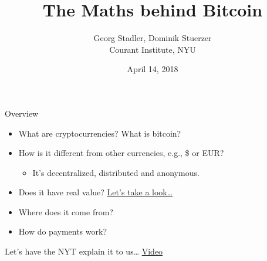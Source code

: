 \documentclass[12pt]{beamer}
\title{{\bf The Maths behind Bitcoin }}
\date{April 14, 2018}
\author{Georg Stadler, Dominik Stuerzer \\ Courant Institute, NYU}
\theoremstyle{definition}
\numberwithin{equation}{section}
\begin{document}
\begin{frame}
\maketitle
\end{frame}


\begin{frame}{Overview}
  \begin{itemize}
  \item What are cryptocurrencies? What is bitcoin?\\[3ex]
    \pause
  \item How is it different from other currencies, e.g., \$ or EUR? \\[1ex]
    \pause
    \begin{itemize}
      \item It's decentralized, distributed and anonymous.\\[1ex]
    \end{itemize}
    \pause
  \item Does it have real value?
    \href{https://www.coindesk.com/price/}{Let's take a look\ldots}\\[3ex]
    \pause
  \item Where does it come from?\\[3ex]
    \pause
  \item How do payments work?
  \end{itemize}
\end{frame}


\begin{frame}{Let's have the NYT explain it to us\ldots}
\centering
  \href{https://www.nytimes.com/video/business/100000005675385/baffled-by-bitcoin-heres-how-cryptocurrency-works.html?smid=pl-share}{\Large
    Video}\\[3ex]  
\end{frame}
\end{document}
